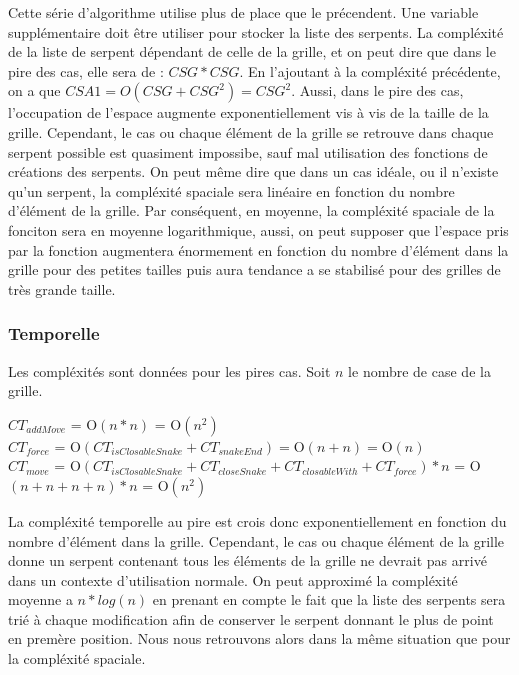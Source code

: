 \documentclass[a4paper,12pt]{report}
\begin{document}
Cette s\'erie d'algorithme utilise plus de place que le pr\'ecendent. Une variable suppl\'ementaire doit \^etre utiliser pour stocker la liste des serpents. La compl\'exit\'e de la liste de serpent d\'ependant de celle de la grille, et on peut dire que dans le pire des cas, elle sera de : $CSG*CSG$. En l'ajoutant \`a la compl\'exit\'e pr\'ec\'edente, on a que $CSA1=O(CSG+CSG^2)=CSG^2$. Aussi, dans le pire des cas, l'occupation de l'espace augmente exponentiellement vis \`a vis de la taille de la grille. Cependant, le cas ou chaque \'el\'ement de la grille se retrouve dans chaque serpent possible est quasiment impossibe, sauf mal utilisation des fonctions de cr\'eations des serpents. On peut m\^eme dire que dans un cas id\'eale, ou il n'existe qu'un serpent, la compl\'exit\'e spaciale sera lin\'eaire en fonction du nombre d'\'el\'ement de la grille. Par cons\'equent, en moyenne, la compl\'exit\'e spaciale de la fonciton sera en moyenne logarithmique, aussi, on peut supposer que l'espace pris par la fonction augmentera \'enormement en fonction du nombre d'\'el\'ement dans la grille pour des petites tailles puis aura tendance a se stabilis\'e pour des grilles de tr\`es grande taille. 

\subsubsection{Temporelle}

Les compl\'exit\'es sont donn\'ees pour les pires cas. Soit $n$ le nombre de case de la grille.

$CT_{addMove}$ = O$(n*n)$ = O$(n^2)$ \\
$CT_{force}$ = O$(CT_{isClosableSnake}+CT_{snakeEnd}) = $O$(n+n) = $O$(n)$ \\
$CT_{move}$ = O$(CT_{isClosableSnake}+CT_{closeSnake}+CT_{closableWith}+CT_{force})*n$ = O$(n+n+n+n)*n$ = O$(n^2)$


La compl\'exit\'e temporelle au pire est crois donc exponentiellement en fonction du nombre d'\'el\'ement dans la grille. Cependant, le cas ou chaque \'el\'ement de la grille donne un serpent contenant tous les \'el\'ements de la grille ne devrait pas arriv\'e dans un contexte d'utilisation normale. On peut approxim\'e la compl\'exit\'e moyenne a $n*log(n)$ en prenant en compte le fait que la liste des serpents sera tri\'e \`a chaque modification afin de conserver le serpent donnant le plus de point en prem\`ere position. Nous nous retrouvons alors dans la m\^eme situation que pour la compl\'exit\'e spaciale. 
\end{document}
